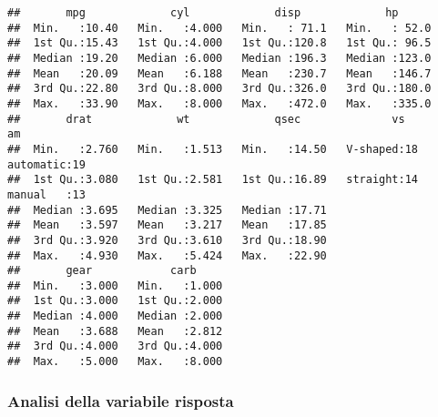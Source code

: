 \documentclass[
]{article}
\newenvironment{Shaded}{\begin{snugshade}}{\end{snugshade}}
\newcommand{\AttributeTok}[1]{\textcolor[rgb]{0.77,0.63,0.00}{#1}}
\newcommand{\DecValTok}[1]{\textcolor[rgb]{0.00,0.00,0.81}{#1}}
\newcommand{\FloatTok}[1]{\textcolor[rgb]{0.00,0.00,0.81}{#1}}
\newcommand{\FunctionTok}[1]{\textcolor[rgb]{0.00,0.00,0.00}{#1}}
\newcommand{\NormalTok}[1]{#1}
\newcommand{\SpecialCharTok}[1]{\textcolor[rgb]{0.00,0.00,0.00}{#1}}
\newcommand{\StringTok}[1]{\textcolor[rgb]{0.31,0.60,0.02}{#1}}
\begin{document}
\begin{verbatim}
##       mpg             cyl             disp             hp       
##  Min.   :10.40   Min.   :4.000   Min.   : 71.1   Min.   : 52.0  
##  1st Qu.:15.43   1st Qu.:4.000   1st Qu.:120.8   1st Qu.: 96.5  
##  Median :19.20   Median :6.000   Median :196.3   Median :123.0  
##  Mean   :20.09   Mean   :6.188   Mean   :230.7   Mean   :146.7  
##  3rd Qu.:22.80   3rd Qu.:8.000   3rd Qu.:326.0   3rd Qu.:180.0  
##  Max.   :33.90   Max.   :8.000   Max.   :472.0   Max.   :335.0  
##       drat             wt             qsec              vs             am    
##  Min.   :2.760   Min.   :1.513   Min.   :14.50   V-shaped:18   automatic:19  
##  1st Qu.:3.080   1st Qu.:2.581   1st Qu.:16.89   straight:14   manual   :13  
##  Median :3.695   Median :3.325   Median :17.71                               
##  Mean   :3.597   Mean   :3.217   Mean   :17.85                               
##  3rd Qu.:3.920   3rd Qu.:3.610   3rd Qu.:18.90                               
##  Max.   :4.930   Max.   :5.424   Max.   :22.90                               
##       gear            carb      
##  Min.   :3.000   Min.   :1.000  
##  1st Qu.:3.000   1st Qu.:2.000  
##  Median :4.000   Median :2.000  
##  Mean   :3.688   Mean   :2.812  
##  3rd Qu.:4.000   3rd Qu.:4.000  
##  Max.   :5.000   Max.   :8.000
\end{verbatim}

\hypertarget{analisi-della-variabile-risposta}{%
\subsubsection{Analisi della variabile
risposta}\label{analisi-della-variabile-risposta}}

\begin{Shaded}
\end{Shaded}
\end{document}
